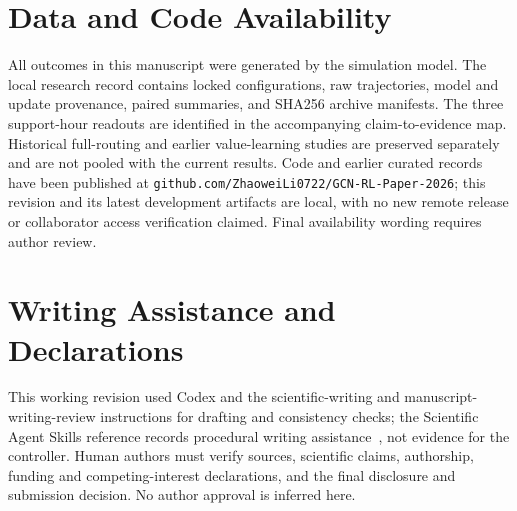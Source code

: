 \documentclass[preprint,review,12pt]{elsarticle}
\begin{document}
\section*{Data and Code Availability}
All outcomes in this manuscript were generated by the simulation model.
The local research record contains locked configurations, raw trajectories,
model and update provenance, paired summaries, and SHA256 archive manifests.
The three support-hour readouts are identified in the accompanying
claim-to-evidence map. Historical full-routing and earlier value-learning
studies are preserved separately and are not pooled with the current results.
Code and earlier curated records have been published at
\texttt{github.com/ZhaoweiLi0722/GCN-RL-Paper-2026}; this revision and its latest
development artifacts are local, with no new remote release or collaborator
access verification claimed. Final availability wording requires author review.

\section*{Writing Assistance and Declarations}
This working revision used Codex and the scientific-writing and
manuscript-writing-review instructions for drafting and consistency checks;
the Scientific Agent Skills reference records procedural writing
assistance~\cite{Kassis2026ScientificAgentSkills}, not evidence for the
controller. Human authors must verify sources, scientific claims,
authorship, funding and competing-interest declarations, and the final
disclosure and submission decision. No author approval is inferred here.


\end{document}

